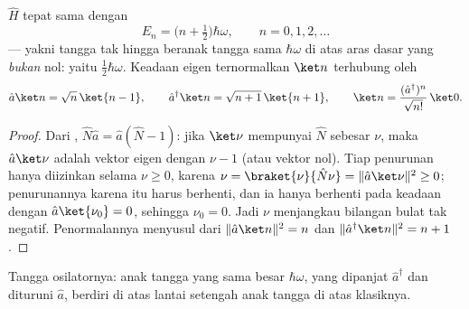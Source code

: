 \begin{theorem}\label{thm:b3:harmonic-oscillator:spectrum}
 $\hat H$ tepat sama dengan
\[
E_n = \Big(n + \tfrac12\Big)\hbar\omega , \qquad n = 0, 1, 2, \dots
\]
--- yakni tangga tak hingga beranak tangga sama $\hbar\omega$ di atas
aras dasar yang \emph{bukan} nol: yaitu \emph{}
$\tfrac12\hbar\omega$. Keadaan eigen ternormalkan $\ket n$ terhubung
oleh
\[
\hat a\ket n = \sqrt n\,\ket{n - 1} , \qquad
\hat a^\dagger\ket n = \sqrt{n + 1}\,\ket{n + 1} ,
\qquad
\ket n = \frac{(\hat a^\dagger)^n}{\sqrt{n!}}\,\ket0 .
\]
\end{theorem}

\begin{proof}
Dari , $\hat N\hat a = \hat a(\hat N - 1)$: jika
$\ket\nu$ mempunyai  $\hat N$ sebesar $\nu$, maka $\hat a\ket\nu$
adalah vektor eigen dengan $\nu - 1$ (atau vektor nol). Tiap penurunan
hanya diizinkan selama $\nu \ge 0$, karena $\nu = \braket{\nu}{\hat
N\nu} = \|\hat a\ket\nu\|^2 \ge 0$; penurunannya karena itu harus
berhenti, dan ia hanya berhenti pada keadaan dengan $\hat a\ket{\nu_0}
= 0$, sehingga $\nu_0 = 0$. Jadi $\nu$ menjangkau bilangan bulat tak
negatif. Penormalannya menyusul dari $\|\hat a\ket n\|^2 = n$
dan $\|\hat a^\dagger\ket n\|^2 = n + 1$.
\end{proof}

\begin{omfigure}

{\small Tangga osilatornya: anak tangga yang sama besar $\hbar\omega$,
yang dipanjat $\hat a^\dagger$ dan dituruni $\hat a$, berdiri di atas
lantai setengah anak tangga di atas  klasiknya.}
\end{omfigure}

